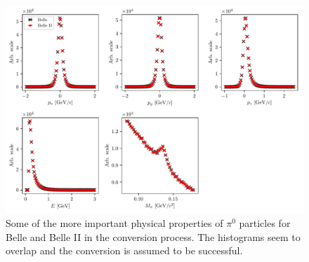 \begin{figure}[H]
	\centering
	\captionsetup{width=0.8\linewidth}
	\includegraphics[width=\linewidth]{fig/b2bii_pi0s}
	\caption{Some of the more important physical properties of $\pi^0$ particles for Belle and Belle II in the conversion process. The histograms seem to overlap and the conversion is assumed to be successful.}
	\label{fig:b2bii_pi0s}
\end{figure}

%
%
%
